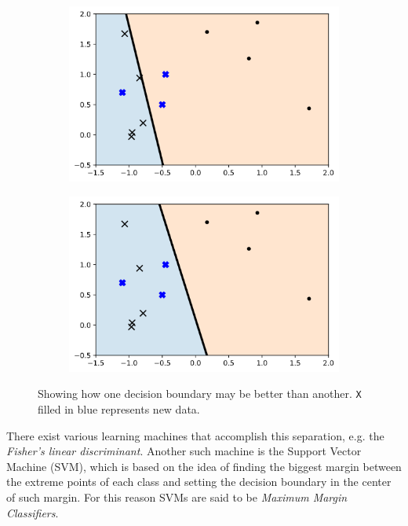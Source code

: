 \begin{figure}[H]
    \centering
    \begin{subfigure}[b]{0.4\linewidth}
        \includegraphics[width=\linewidth]{img/ch4/boundrybad.png}
    \end{subfigure}
    \begin{subfigure}[b]{0.4\linewidth}
        \includegraphics[width=\linewidth]{img/ch4/boundrygood.png}
    \end{subfigure}
    \caption{Showing how one decision boundary may be better than another. \texttt{X} filled in blue represents new data.}
    \label{fig:ch4.sep1}
\end{figure}

There exist various learning machines that accomplish this separation, e.g. the \emph{Fisher’s linear discriminant}. Another such machine is the Support Vector Machine (SVM), which is based on the idea of finding the biggest margin between the extreme points of each class and setting the decision boundary in the center of such margin. For this reason SVMs are said to be \emph{Maximum Margin Classifiers}.

